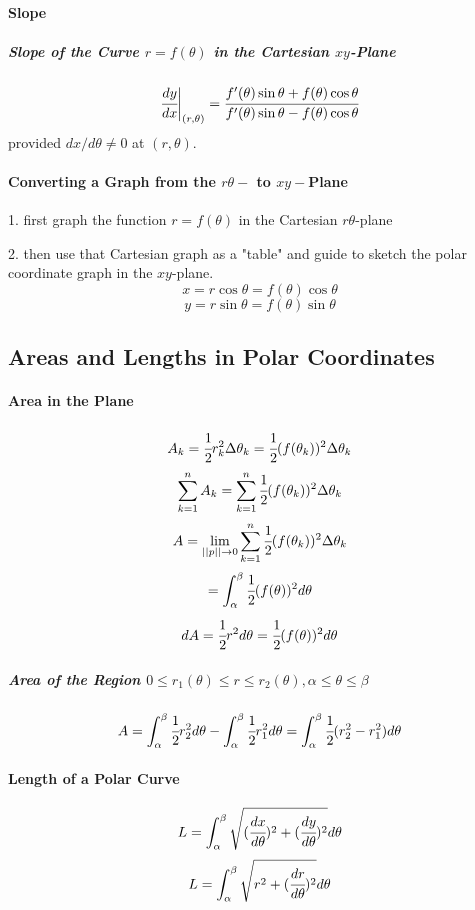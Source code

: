\documentclass{article}
\begin{document}
            \paragraph{Slope}
                \subparagraph{Slope of the Curve $r=f(\theta)$ in the Cartesian $xy$-Plane}
                \[\cfrac{dy}{dx}\bigg|_{(r,\theta)}=\cfrac{f'(\theta)\sin \theta+f(\theta)\cos \theta}{f'(\theta)\sin \theta-f(\theta)\cos \theta}\]
                provided $dx/d\theta\ne 0$ at $(r,\theta)$.
            \paragraph{Converting a Graph from the $r\theta-$ to $xy-$Plane}
                \par 1. first graph the function $r=f(\theta)$ in the Cartesian $r\theta$-plane
                \par 2. then use that Cartesian graph as a "table" and guide to sketch the polar coordinate graph in the $xy$-plane.
                \[x=r\cos\theta=f(\theta)\cos\theta\]
                \[y=r\sin\theta=f(\theta)\sin\theta\]
        \subsection{Areas and Lengths in Polar Coordinates}
            \paragraph{Area in the Plane}
                \[A_k=\cfrac{1}{2}r_k ^2\Delta \theta_k=\cfrac{1}{2}(f(\theta_k))^2\Delta\theta_k\]
                \[\sum_{k=1}^{n}A_k=\sum_{k=1}^n\cfrac{1}{2}(f(\theta_k))^2\Delta\theta_k\]
                \[A=\lim\limits_{||p||\to 0}\sum_{k=1}^n\cfrac{1}{2}(f(\theta_k))^2\Delta\theta_k\]
                \[=\int_\alpha^\beta \cfrac{1}{2}(f(\theta))^2d\theta\]
                \[dA=\cfrac{1}{2}r^2d\theta=\cfrac{1}{2}(f(\theta))^2d\theta\]
                \subparagraph{Area of the Region $0\le r_1(\theta)\le r\le r_2(\theta),\alpha\le\theta\le\beta$}
                \[A=\int_\alpha^\beta \cfrac{1}{2}r_2^2d\theta-\int_\alpha^\beta \cfrac{1}{2}r_1^2d\theta=\int_\alpha^\beta \cfrac{1}{2}(r_2^2-r_1^2)d\theta\]
            \paragraph{Length of a Polar Curve}
                \[L=\int_\alpha^\beta\sqrt{(\cfrac{dx}{d\theta})^2+(\cfrac{dy}{d\theta})^2}d\theta\]
                \[L=\int_\alpha^\beta\sqrt{r^2+(\cfrac{dr}{d\theta})^2}d\theta\]
\end{document}
